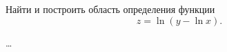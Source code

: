 \begin{problem}
Найти и построить область определения функции
\[ z = \ln(y - \ln x). \]
\end{problem}

\begin{solution}
  \dots
\end{solution}